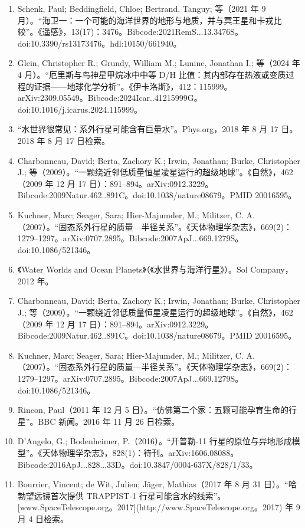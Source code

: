 \begin{enumerate}
\item Schenk, Paul; Beddingfield, Chloe; Bertrand, Tanguy; 等（2021 年 9 月）。“海卫一：一个可能的海洋世界的地形与地质，并与冥王星和卡戎比较”。《遥感》，13(17)：3476。Bibcode:2021RemS...13.3476S。doi:10.3390/rs13173476。hdl:10150/661940。
\item Glein, Christopher R.; Grundy, William M.; Lunine, Jonathan I.; 等（2024 年 4 月）。“厄里斯与鸟神星甲烷冰中中等 D/H 比值：其内部存在热液或变质过程的证据——地球化学分析”。《伊卡洛斯》，412：115999。arXiv:2309.05549。Bibcode:2024Icar..41215999G。doi:10.1016/j.icarus.2024.115999。
\item “水世界很常见：系外行星可能含有巨量水”。Phys.org，2018 年 8 月 17 日。2018 年 8 月 17 日检索。
\item Charbonneau, David; Berta, Zachory K.; Irwin, Jonathan; Burke, Christopher J.; 等（2009）。“一颗绕近邻低质量恒星凌星运行的超级地球”。《自然》，462（2009 年 12 月 17 日）：891–894。arXiv:0912.3229。Bibcode:2009Natur.462..891C。doi:10.1038/nature08679。PMID 20016595。
\item Kuchner, Marc; Seager, Sara; Hier-Majumder, M.; Militzer, C. A.（2007）。“固态系外行星的质量—半径关系”。《天体物理学杂志》，669(2)：1279–1297。arXiv:0707.2895。Bibcode:2007ApJ...669.1279S。doi:10.1086/521346。
\item 《Water Worlds and Ocean Planets》（《水世界与海洋行星》）。Sol Company，2012 年。
\item Charbonneau, David; Berta, Zachory K.; Irwin, Jonathan; Burke, Christopher J.; 等（2009）。“一颗绕近邻低质量恒星凌星运行的超级地球”。《自然》，462（2009 年 12 月 17 日）：891–894。arXiv:0912.3229。Bibcode:2009Natur.462..891C。doi:10.1038/nature08679。PMID 20016595。
\item Kuchner, Marc; Seager, Sara; Hier-Majumder, M.; Militzer, C. A.（2007）。“固态系外行星的质量—半径关系”。《天体物理学杂志》，669(2)：1279–1297。arXiv:0707.2895。Bibcode:2007ApJ...669.1279S。doi:10.1086/521346。
\item Rincon, Paul（2011 年 12 月 5 日）。“仿佛第二个家：五颗可能孕育生命的行星”。BBC 新闻。2016 年 11 月 26 日检索。
\item D'Angelo, G.; Bodenheimer, P.（2016）。“开普勒-11 行星的原位与异地形成模型”。《天体物理学杂志》，828(1)：待刊。arXiv:1606.08088。Bibcode:2016ApJ...828...33D。doi:10.3847/0004-637X/828/1/33。
\item Bourrier, Vincent; de Wit, Julien; Jäger, Mathias（2017 年 8 月 31 日）。“哈勃望远镜首次提供 TRAPPIST-1 行星可能含水的线索”。[www.SpaceTelescope.org。2017](http://www.SpaceTelescope.org。2017) 年 9 月 4 日检索。

\end{enumerate}
